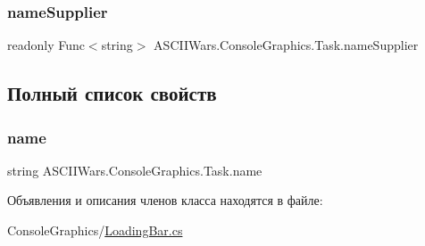 \subsubsection{\texorpdfstring{name\+Supplier}{nameSupplier}}
{\footnotesize\ttfamily readonly Func$<$string$>$ A\+S\+C\+I\+I\+Wars.\+Console\+Graphics.\+Task.\+name\+Supplier}



\subsection{Полный список свойств}
\hypertarget{class_a_s_c_i_i_wars_1_1_console_graphics_1_1_task_a235e892a10d43807b743c0edf8855df3}{}\label{class_a_s_c_i_i_wars_1_1_console_graphics_1_1_task_a235e892a10d43807b743c0edf8855df3} 
\subsubsection{\texorpdfstring{name}{name}}
{\footnotesize\ttfamily string A\+S\+C\+I\+I\+Wars.\+Console\+Graphics.\+Task.\+name\hspace{0.3cm}{\ttfamily [get]}}



Объявления и описания членов класса находятся в файле\+:\begin{DoxyCompactItemize}
\item 
Console\+Graphics/\hyperlink{_loading_bar_8cs}{Loading\+Bar.\+cs}\end{DoxyCompactItemize}
